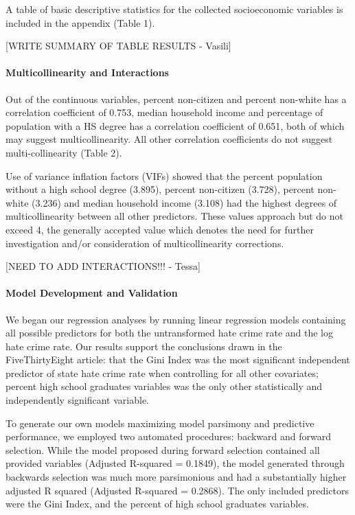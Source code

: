 \documentclass[
]{article}
\begin{document}
A table of basic descriptive statistics for the collected socioeconomic
variables is included in the appendix (Table 1).

{[}WRITE SUMMARY OF TABLE RESULTS - Vasili{]}

\hypertarget{multicollinearity-and-interactions-1}{%
\paragraph{Multicollinearity and
Interactions}\label{multicollinearity-and-interactions-1}}

Out of the continuous variables, percent non-citizen and percent
non-white has a correlation coefficient of 0.753, median household
income and percentage of population with a HS degree has a correlation
coefficient of 0.651, both of which may suggest multicollinearity. All
other correlation coefficients do not suggest multi-collinearity (Table
2).

Use of variance inflation factors (VIFs) showed that the percent
population without a high school degree (3.895), percent non-citizen
(3.728), percent non-white (3.236) and median household income (3.108)
had the highest degrees of multicollinearity between all other
predictors. These values approach but do not exceed 4, the generally
accepted value which denotes the need for further investigation and/or
consideration of multicollinearity corrections.

{[}NEED TO ADD INTERACTIONS!!! - Tessa{]}

\hypertarget{model-development-and-validation-1}{%
\paragraph{Model Development and
Validation}\label{model-development-and-validation-1}}

We began our regression analyses by running linear regression models
containing all possible predictors for both the untransformed hate crime
rate and the log hate crime rate. Our results support the conclusions
drawn in the FiveThirtyEight article: that the Gini Index was the most
significant independent predictor of state hate crime rate when
controlling for all other covariates; percent high school graduates
variables was the only other statistically and independently significant
variable.

To generate our own models maximizing model parsimony and predictive
performance, we employed two automated procedures: backward and forward
selection. While the model proposed during forward selection contained
all provided variables (Adjusted R-squared = 0.1849), the model
generated through backwards selection was much more parsimonious and had
a substantially higher adjusted R squared (Adjusted R-squared = 0.2868).
The only included predictors were the Gini Index, and the percent of
high school graduates variables.
\end{document}
